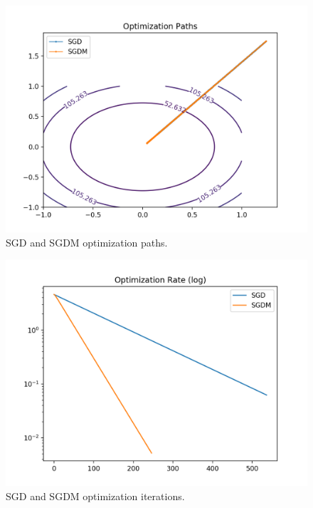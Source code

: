 \documentclass[twoside,11pt]{homework}
\DeclarePairedDelimiter{\2norm}{\lVert}{\rVert^2_2}
\newcommand{\1}[1]{\mathds{1}\left[#1\right]}
\begin{document}
\begin{enumerate}[\bf (i)]
\begin{enumerate}
       \begin{figure}[h!]
         \centering
         \includegraphics[width=6in]{img/sgdm.png}
         \caption{SGD and SGDM optimization paths.}
         \label{fig:sgdm}
       \end{figure}

       \begin{figure}[h!]
         \centering
         \includegraphics[width=6in]{img/sgdm2.png}
         \caption{SGD and SGDM optimization iterations.}
         \label{fig:sgdm2}
       \end{figure}


\end{enumerate}
\end{enumerate}
\end{document}
